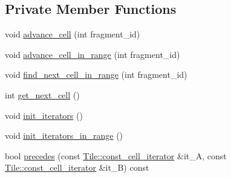 \subsection*{Private Member Functions}
\begin{DoxyCompactItemize}
\item 
void \hyperlink{classStorageManager_1_1Array_1_1const__cell__iterator_a1ef56c0ae1852ba31b69436cf633d3ec}{advance\+\_\+cell} (int fragment\+\_\+id)
\item 
void \hyperlink{classStorageManager_1_1Array_1_1const__cell__iterator_a5472ffeec5777341b00b948314aa23dd}{advance\+\_\+cell\+\_\+in\+\_\+range} (int fragment\+\_\+id)
\item 
void \hyperlink{classStorageManager_1_1Array_1_1const__cell__iterator_a1bd9680a8a7d9d4769c230d79bd8a704}{find\+\_\+next\+\_\+cell\+\_\+in\+\_\+range} (int fragment\+\_\+id)
\item 
int \hyperlink{classStorageManager_1_1Array_1_1const__cell__iterator_abcc406d0db61c44cbeb741d3787fd466}{get\+\_\+next\+\_\+cell} ()
\item 
void \hyperlink{classStorageManager_1_1Array_1_1const__cell__iterator_a67b6ae03d1479eb2ca87f3151e395792}{init\+\_\+iterators} ()
\item 
void \hyperlink{classStorageManager_1_1Array_1_1const__cell__iterator_af2dd152c32f19ceed94fcf9e92698364}{init\+\_\+iterators\+\_\+in\+\_\+range} ()
\item 
bool \hyperlink{classStorageManager_1_1Array_1_1const__cell__iterator_ae0884e3a0c28e5e1dd4409d2bfca549c}{precedes} (const \hyperlink{classTile_1_1const__cell__iterator}{Tile\+::const\+\_\+cell\+\_\+iterator} \&it\+\_\+\+A, const \hyperlink{classTile_1_1const__cell__iterator}{Tile\+::const\+\_\+cell\+\_\+iterator} \&it\+\_\+\+B) const 
\end{DoxyCompactItemize}
